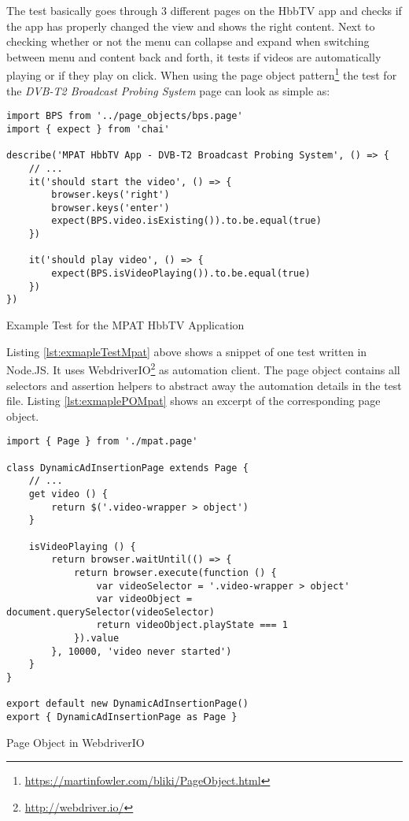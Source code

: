 The test basically goes through 3 different pages on the HbbTV app and checks if the app has properly changed the view and shows the right content. Next to checking whether or not the menu can collapse and expand when switching between menu and content back and forth, it tests if videos are automatically playing or if they play on click. When using the page object pattern\footnote{\url{https://martinfowler.com/bliki/PageObject.html}} the test for the \textit{DVB-T2 Broadcast Probing System} page can look as simple as:

\hspace*{0.5cm}
\begin{listing}[H]
\begin{verbatim}
import BPS from '../page_objects/bps.page'
import { expect } from 'chai'

describe('MPAT HbbTV App - DVB-T2 Broadcast Probing System', () => {
    // ...
    it('should start the video', () => {
        browser.keys('right')
        browser.keys('enter')
        expect(BPS.video.isExisting()).to.be.equal(true)
    })

    it('should play video', () => {
        expect(BPS.isVideoPlaying()).to.be.equal(true)
    })
})
\end{verbatim}
\caption{Example Test for the MPAT HbbTV Application}
\label{lst:exmapleTestMpat}
\end{listing}

Listing \ref{lst:exmapleTestMpat} above shows a snippet of one test written in Node.JS. It uses WebdriverIO\footnote{\url{http://webdriver.io/}} as automation client. The page object contains all selectors and assertion helpers to abstract away the automation details in the test file. Listing \ref{lst:exmaplePOMpat} shows an excerpt of the corresponding page object.

\hspace*{0.5cm}
\begin{listing}[H]
\begin{verbatim}
import { Page } from './mpat.page'

class DynamicAdInsertionPage extends Page {
    // ...
    get video () {
        return $('.video-wrapper > object')
    }

    isVideoPlaying () {
        return browser.waitUntil(() => {
            return browser.execute(function () {
                var videoSelector = '.video-wrapper > object'
                var videoObject = document.querySelector(videoSelector)
                return videoObject.playState === 1
            }).value
        }, 10000, 'video never started')
    }
}

export default new DynamicAdInsertionPage()
export { DynamicAdInsertionPage as Page }
\end{verbatim}
\caption{Page Object in WebdriverIO}
\label{lst:exmaplePOMpat}
\end{listing}

